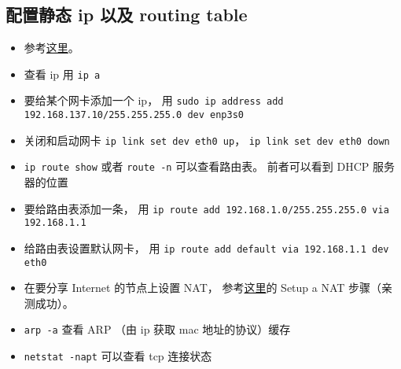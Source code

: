 \subsection{配置静态 ip 以及 routing table}
\begin{itemize}
\item 参考\href{https://linuxiac.com/how-to-set-static-ip-address-and-modifying-routing-table-on-linux/}{这里}。
\item 查看 ip 用 \verb|ip a|
\item 要给某个网卡添加一个 ip， 用 \verb|sudo ip address add 192.168.137.10/255.255.255.0 dev enp3s0|
\item 关闭和启动网卡 \verb|ip link set dev eth0 up|， \verb|ip link set dev eth0 down|
\item \verb|ip route show| 或者 \verb|route -n| 可以查看路由表。 前者可以看到 DHCP 服务器的位置
\item 要给路由表添加一条， 用 \verb|ip route add 192.168.1.0/255.255.255.0 via 192.168.1.1|
\item 给路由表设置默认网卡， 用 \verb|ip route add default via 192.168.1.1 dev eth0|
\item 在要分享 Internet 的节点上设置 NAT， 参考\href{https://unix.stackexchange.com/questions/575178/sharing-wifi-internet-through-ethernet-interface}{这里}的 Setup a NAT 步骤（亲测成功）。

\item \verb|arp -a| 查看 ARP （由 ip 获取 mac 地址的协议）缓存
\item \verb|netstat -napt| 可以查看 tcp 连接状态
\end{itemize}
